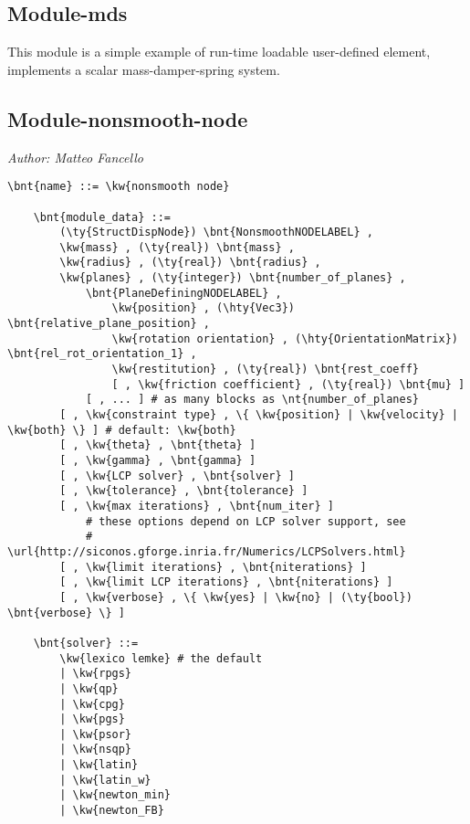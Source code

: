 \subsection{Module-mds}
This module is a simple example of run-time loadable user-defined element,
implements a scalar mass-damper-spring system.

\subsection{Module-nonsmooth-node}
\emph{Author: Matteo Fancello}
\begin{Verbatim}[commandchars=\\\{\}]
    \bnt{name} ::= \kw{nonsmooth node}

    \bnt{module_data} ::=
        (\ty{StructDispNode}) \bnt{NonsmoothNODELABEL} ,
        \kw{mass} , (\ty{real}) \bnt{mass} ,
        \kw{radius} , (\ty{real}) \bnt{radius} ,
        \kw{planes} , (\ty{integer}) \bnt{number_of_planes} ,
            \bnt{PlaneDefiningNODELABEL} ,
                \kw{position} , (\hty{Vec3}) \bnt{relative_plane_position} ,
                \kw{rotation orientation} , (\hty{OrientationMatrix}) \bnt{rel_rot_orientation_1} ,
                \kw{restitution} , (\ty{real}) \bnt{rest_coeff}
                [ , \kw{friction coefficient} , (\ty{real}) \bnt{mu} ] 
            [ , ... ] # as many blocks as \nt{number_of_planes}
        [ , \kw{constraint type} , \{ \kw{position} | \kw{velocity} | \kw{both} \} ] # default: \kw{both}
        [ , \kw{theta} , \bnt{theta} ]
        [ , \kw{gamma} , \bnt{gamma} ]
        [ , \kw{LCP solver} , \bnt{solver} ]
        [ , \kw{tolerance} , \bnt{tolerance} ]
        [ , \kw{max iterations} , \bnt{num_iter} ]
            # these options depend on LCP solver support, see
            # \url{http://siconos.gforge.inria.fr/Numerics/LCPSolvers.html}
        [ , \kw{limit iterations} , \bnt{niterations} ]
        [ , \kw{limit LCP iterations} , \bnt{niterations} ]
        [ , \kw{verbose} , \{ \kw{yes} | \kw{no} | (\ty{bool}) \bnt{verbose} \} ]

    \bnt{solver} ::=
        \kw{lexico lemke} # the default
        | \kw{rpgs}
        | \kw{qp}
        | \kw{cpg}
        | \kw{pgs}
        | \kw{psor}
        | \kw{nsqp}
        | \kw{latin}
        | \kw{latin_w}
        | \kw{newton_min}
        | \kw{newton_FB}
\end{Verbatim}

